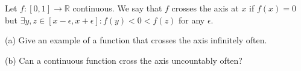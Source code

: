 Let $f: [0,1]\rightarrow \mathbb{R}$ continuous. We say that $f$ crosses the axis at $x$ if $f(x)=0$ but $\exists y,z \in [x-\epsilon,x+\epsilon]: f(y)<0<f(z)$ for any $\epsilon$.

(a) Give an example of a function that crosses the axis infinitely often.

(b) Can a continuous function cross the axis uncountably often?